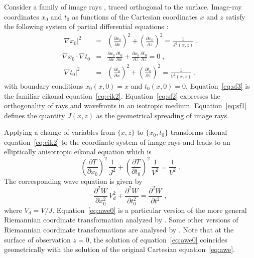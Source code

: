 \documentclass[manuscript]{geophysics}
\begin{document}
Consider a family of image rays \cite[]{hubral1977time}, traced
orthogonal to the surface. Image-ray coordinates $x_0$ and $t_0$ as
functions of the Cartesian coordinates $x$ and $z$ satisfy the
following system of partial differential equations :
\begin {eqnarray}
  |\nabla x_0|^2&=&\left(\frac{\partial x_0}{\partial x}\right)^2+\left(\frac{\partial x_0}{\partial z}\right)^2
  =\frac{1}{J^2(x,z)}\;, \label{eq:sf1} \\
  \nabla x_0\cdot\nabla t_0&=&\frac{\partial x_0}{\partial x}\frac{\partial t_0}{\partial x}+
\frac{\partial x_0}{\partial z}\frac{\partial t_0}{\partial z}=0\;, \label{eq:sf2} \\
|\nabla t_0|^2&=&\left(\frac{\partial t_0}{\partial x}\right)^2+\left(\frac{\partial t_0}{\partial z}\right)^2
=\frac{1}{V^2(x,z)}\;, \label{eq:sf3} 
\end{eqnarray}
with boundary conditions $x_0(x,0)=x$ and
$t_0(x,0)=0$. Equation~\ref{eq:sf3} is the familiar eikonal
equation~\ref{eq:eik2}. Equation~\ref{eq:sf2} expresses the
orthogonality of rays and wavefronts in an isotropic
medium. Equation~\ref{eq:sf1} defines the quantity $J(x,z)$ as the
geometrical spreading of image rays.

Applying a change of variables from $\{x,z\}$ to $\{x_0,t_0\}$ 
transforms eikonal equation~\ref{eq:eik2} to the
coordinate system of image rays and leads to an
elliptically anisotropic eikonal equation which is
\begin{equation}
\label{eq:eik0}
\left(\frac{\partial T}{\partial x_0}\right)^2\,\frac{1}{J^2} + \left(\frac{\partial T}{\partial t_0}\right)^2\,\frac{1}{V^2} = \frac{1}{V^2}\;.
\end{equation}
The corresponding wave equation is given by
\begin{equation}
\label{eq:awe0}
\frac{\partial^2 W}{\partial x_0^2}\,V_d^2 + \frac{\partial^2 W}{\partial t_0^2} = \frac{\partial^2 W}{\partial t^2}\;,
\end{equation}
where $V_d=V/J$. Equation~\ref{eq:awe0} is a particular version of
the more general Riemannian coordinate transformation analyzed
by \cite{sava2005riemannian}. Some other versions of Riemannian coordinate transformations are analysed by \cite{shragge2008riemannian,shragge2008prestack}. Note that at the surface of observation
$z=0$, the solution of equation~\ref{eq:awe0} coincides
geometrically with the solution of the original Cartesian
equation~\ref{eq:awe}.
\end{document}
